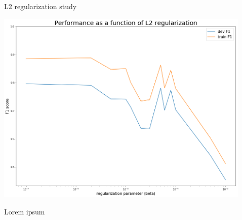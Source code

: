 \documentclass[final]{beamer}
\newlength{\sepwid}
\newlength{\onecolwid}
\newlength{\twocolwid}
\begin{document}
\begin{frame}[t]
\begin{columns}[t]
\begin{column}{\twocolwid}
\begin{columns}[t,totalwidth=\twocolwid]
\begin{column}{\onecolwid}
\begin{block}{L2 regularization study}

\begin{center}
\includegraphics[scale=0.5]{figs/l2_graph.png}
\end{center}

Lorem ipsum

\end{block}


\end{column} %

\end{columns} %

\end{column} %

\begin{column}{\sepwid}\end{column} %

\begin{column}{\onecolwid} %



\end{column}
\end{columns}
\end{frame}
\end{document}
